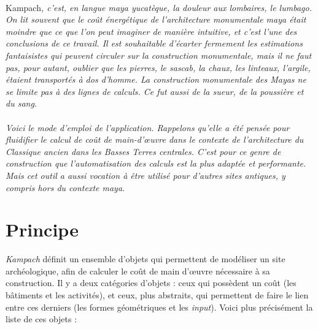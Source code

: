\documentclass{article}
\begin{document}
 
\paragraph{}
Kampach\textit{, c'est, en langue maya yucatèque, la douleur aux lombaires, le lumbago. On lit souvent que le coût énergétique de l'architecture monumentale maya était moindre que ce que l'on peut imaginer de manière intuitive, et c'est l'une des conclusions de ce travail. Il est souhaitable d'écarter fermement les estimations fantaisistes qui peuvent circuler sur la construction monumentale, mais il ne faut pas, pour autant, oublier que les pierres, le \textit{sascab}, la chaux, les linteaux, l'argile, étaient transportés à dos d'homme. La construction monumentale des Mayas ne se limite pas à des lignes de calculs. Ce fut aussi de la sueur, de la poussière et du sang.}

\paragraph{}
\textit{Voici le mode d'emploi de l'application. Rappelons qu'elle a été pensée pour fluidifier le calcul de coût de main-d'œuvre dans le contexte de l'architecture du Classique ancien dans les Basses Terres centrales. C'est pour ce genre de construction que l'automatisation des calculs est la plus adaptée et performante. Mais cet outil a aussi vocation à être utilisé pour d'autres sites antiques, y compris hors du contexte maya.}

\section{Principe}
\textit{Kampach} définit un ensemble d'objets qui permettent de modéliser un site archéologique, afin de calculer le coût de main d'œuvre nécessaire à sa construction. Il y a deux catégories d'objets : ceux qui possèdent un coût (les bâtiments et les activités), et ceux, plus abstraits, qui permettent de faire le lien entre ces derniers (les formes géométriques et les \textit{input}). Voici plus précisément la liste de ces objets :
\end{document}
